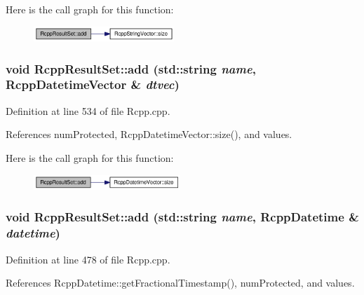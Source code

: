 Here is the call graph for this function:\nopagebreak
\begin{figure}[H]
\begin{center}
\leavevmode
\includegraphics[width=150pt]{classRcppResultSet_10d01a24ef006c1ff14ca7e95fb9e0ea_cgraph}
\end{center}
\end{figure}
\hypertarget{classRcppResultSet_ac8cade970247a377e8dbebf1c79a86c}{
\subsubsection[{add}]{\setlength{\rightskip}{0pt plus 5cm}void RcppResultSet::add (std::string {\em name}, \/  {\bf RcppDatetimeVector} \& {\em dtvec})}}
\label{classRcppResultSet_ac8cade970247a377e8dbebf1c79a86c}




Definition at line 534 of file Rcpp.cpp.

References numProtected, RcppDatetimeVector::size(), and values.

Here is the call graph for this function:\nopagebreak
\begin{figure}[H]
\begin{center}
\leavevmode
\includegraphics[width=157pt]{classRcppResultSet_ac8cade970247a377e8dbebf1c79a86c_cgraph}
\end{center}
\end{figure}
\hypertarget{classRcppResultSet_1d921e7a24e50369ae67a1bc63826131}{
\subsubsection[{add}]{\setlength{\rightskip}{0pt plus 5cm}void RcppResultSet::add (std::string {\em name}, \/  {\bf RcppDatetime} \& {\em datetime})}}
\label{classRcppResultSet_1d921e7a24e50369ae67a1bc63826131}




Definition at line 478 of file Rcpp.cpp.

References RcppDatetime::getFractionalTimestamp(), numProtected, and values.

